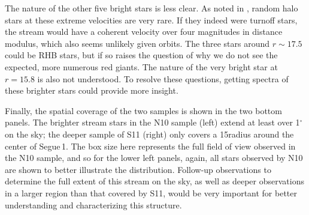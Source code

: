 \documentclass[manuscript]{aastex}
\begin{document}
The nature of the other five bright stars is less clear. As noted in \citet{Geha2009}, random halo stars at these extreme velocities are very rare. If they indeed were turnoff stars, the stream would have a coherent velocity over four magnitudes in distance modulus, which also seems unlikely given orbits. The three stars around $r\sim 17.5$ could be RHB stars, but if so raises the question of why we do not see the expected, more numerous red giants. The nature of the very bright star at $r = 15.8$ is also not understood. To resolve these questions, getting spectra of these brighter stars could provide more insight.

Finally, the spatial coverage of the two samples is shown in the two bottom panels. The brighter stream stars in the N10 sample (left) extend at least over 1$^{\circ}$ on the sky; the deeper sample of S11 (right) only covers a 15\arcmin radius around the center of Segue\,1. The box size here represents the full field of view observed in the N10 sample, and so for the lower left panels, again, all stars observed by N10 are shown to better illustrate the distribution. Follow-up observations to determine the full extent of this stream on the sky, as well as deeper observations in a larger region than that covered by S11, would be very important for better understanding and characterizing this structure.


 
\end{document}
